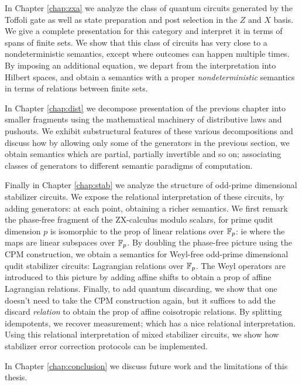 \documentclass[12pt]{ociamthesis}  %
\begin{document}
In Chapter \ref{chap:zxa} we analyze the class of quantum circuits generated by the Toffoli gate as well as state preparation and post selection in the $Z$ and $X$ basis.  We give a complete presentation for this category and interpret it in terms of spans of finite sets.  We show that this class of circuits has very close to a nondeterministic semantics, except where outcomes can happen multiple times.  By imposing an additional equation, we depart from the interpretation into Hilbert spaces, and obtain a semantics with a proper {\em nondeterministic} semantics in terms of relations between finite sets.

In Chapter \ref{chap:dist}  we decompose  presentation of the previous chapter into smaller fragments using the mathematical machinery of distributive laws and pushouts.
We exhibit substructural features of these various decompositions and discuss how by allowing only some of the generators in the previous section, we obtain semantics which are partial, partially invertible and so on; associating classes of generators to different semantic paradigms of computation.


Finally in Chapter \ref{chap:stab}  we analyze the structure of odd-prime dimensional stabilizer circuits.
We expose the relational interpretation of these circuits, by adding generators: at each point, obtaining a richer semantics.  We first remark the phase-free fragment of the ZX-calculus modulo scalars, for prime qudit dimension $p$ is isomorphic to the prop of linear relations over $\mathbb{F}_p$: ie where the maps are linear subspaces over $\mathbb{F}_p$.  By doubling the phase-free picture using the CPM construction, we obtain a semantics for Weyl-free odd-prime dimensional qudit stabilizer circuits: Lagrangian relations over $\mathbb{F}_p$.  The Weyl operators are introduced to this picture by adding affine shifts to obtain a prop of affine Lagrangian relations.  Finally, to add quantum discarding, we show that one doesn't need to take the CPM construction again, but it suffices to add the discard {\em relation} to obtain the prop of affine coisotropic relations.  By splitting idempotents, we recover measurement; which has a nice relational interpretation.  Using this relational interpretation of mixed stabilizer circuits, we show how stabilizer error correction protocols can be implemented.


In Chapter \ref{chap:conclusion} we discuss future work and the limitations of this thesis.
\end{document}
